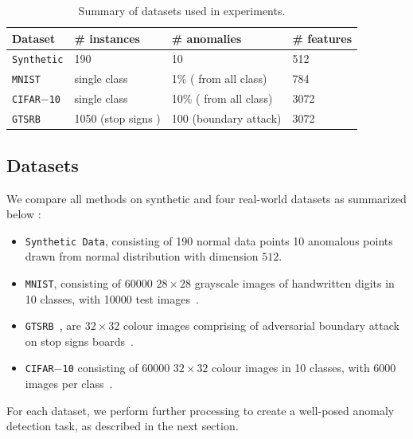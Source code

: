 \begin{table}[!t]
    \centering
    \renewcommand{\arraystretch}{1.25}
    \setlength{\tabcolsep}{6pt}
    \begin{tabular}{@{}llll@{}}
        \toprule
        \toprule
        Dataset & \# instances & \# anomalies & \# features \\
        \toprule
        {\tt Synthetic}       & 190   & 10                                        & 512 \\
        {\tt MNIST}           & single class   & 1\%  ( from all class)            & 784 \\
        {\tt CIFAR$-$10}      & single class    & 10\% ( from all class)           &3072 \\
        {\tt GTSRB }           & 1050 (stop signs )     & 100 (boundary attack)  &3072 \\
        \bottomrule
    \end{tabular}
    \caption{Summary of datasets used in experiments.}
    \label{tbl:datasets}
    \vspace{-\baselineskip}
\end{table}

\subsection{Datasets}
We compare all methods on synthetic and four real-world datasets as summarized below :
\begin{itemize}
	\item {\tt Synthetic Data}, consisting of 190 normal data points 10 anomalous points drawn from normal distribution with dimension $512$.
	\item {\tt MNIST}, consisting of 60000 $28\times28$ grayscale images of handwritten digits  in 10 classes, with 10000  test images~\cite{lecun2010mnist}.
	\item {\tt GTSRB }, are $32\times32$ colour images comprising of  adversarial boundary attack on stop signs boards~\cite{stallkamp2011german}.
	\item {\tt CIFAR$-$10} consisting of 60000 $32\times32$ colour images in 10 classes, with 6000 images per class~\cite{krizhevsky2009learning}.
\end{itemize}

For each dataset, we perform further processing to create a well-posed anomaly detection task, as described in the next section.
\vspace{-0.3 cm}


